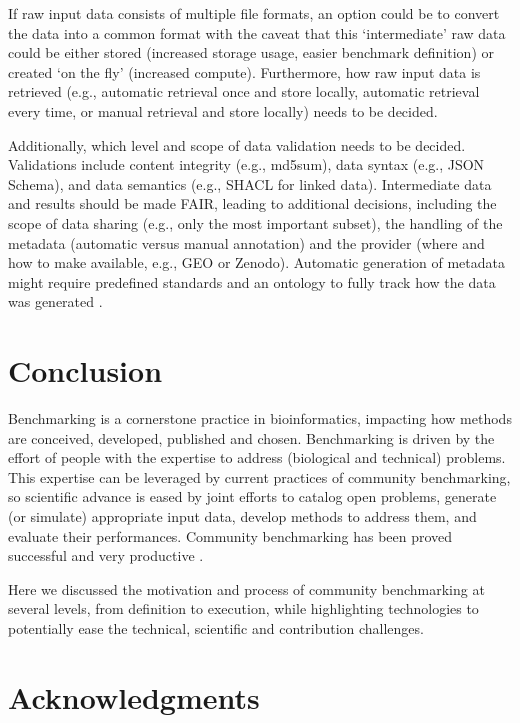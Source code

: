 \documentclass[11pt]{article}
\begin{document}
If raw input data consists of multiple file formats, an option could be to convert the data into a common format with the caveat that this `intermediate' raw data could be either stored (increased storage usage, easier benchmark definition) or created `on the fly' (increased compute). Furthermore, how raw input data is retrieved (e.g., automatic retrieval once and store locally, automatic retrieval every time, or manual retrieval and store locally) needs to be decided.

Additionally, which level and scope of data validation needs to be decided. Validations include content integrity (e.g., md5sum), data syntax (e.g., JSON Schema), and data semantics (e.g., SHACL for linked data). Intermediate data and results should be made FAIR, leading to additional decisions, including the scope of data sharing (e.g., only the most important subset), the handling of the metadata (automatic versus manual annotation) and the provider (where and how to make available, e.g., GEO or Zenodo). Automatic generation of metadata might require predefined standards and an ontology to fully track how the data was generated \cite{LeboUnknown-om}. 


\section*{Conclusion}
\label{sec:conclusion}

Benchmarking is a cornerstone practice in bioinformatics, impacting how methods are conceived, developed, published and chosen. Benchmarking is driven by the effort of people with the expertise to address (biological and technical) problems. This expertise can be leveraged by current practices of community benchmarking, so scientific advance is eased by joint efforts to catalog open problems, generate (or simulate) appropriate input data, develop methods to address them, and evaluate their performances. Community benchmarking has been proved successful and very productive \cite{Moult2005-ne,Capella-Gutierrez2017-dh,Luecken2024-fk}.

Here we discussed the motivation and process of community benchmarking at several levels, from definition to execution, while highlighting technologies to potentially ease the technical, scientific and contribution challenges. 

\hfill

\section*{Acknowledgments} 
\end{document}
